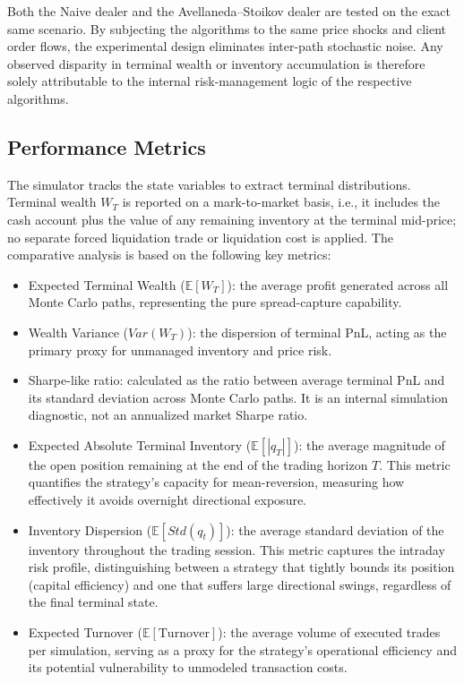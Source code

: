 Both the Naive dealer and the Avellaneda--Stoikov dealer are tested on the exact same scenario. By subjecting the algorithms to the same price shocks and client order flows, the experimental design eliminates inter-path stochastic noise. Any observed disparity in terminal wealth or inventory accumulation is therefore solely attributable to the internal risk-management logic of the respective algorithms.

\subsection{Performance Metrics}
The simulator tracks the state variables to extract terminal distributions. Terminal wealth $W_T$ is reported on a mark-to-market basis, i.e., it includes the cash account plus the value of any remaining inventory at the terminal mid-price; no separate forced liquidation trade or liquidation cost is applied. The comparative analysis is based on the following key metrics:

\begin{itemize}
    \item Expected Terminal Wealth ($\mathbb{E}[W_T]$): the average profit generated across all Monte Carlo paths, representing the pure spread-capture capability.
    \item Wealth Variance ($Var(W_T)$): the dispersion of terminal PnL, acting as the primary proxy for unmanaged inventory and price risk.
    \item Sharpe-like ratio: calculated as the ratio between average terminal PnL and its standard deviation across Monte Carlo paths. It is an internal simulation diagnostic, not an annualized market Sharpe ratio.
    \item Expected Absolute Terminal Inventory ($\mathbb{E}[|q_T|]$): the average magnitude of the open position remaining at the end of the trading horizon $T$. This metric quantifies the strategy's capacity for mean-reversion, measuring how effectively it avoids overnight directional exposure.
    \item Inventory Dispersion ($\mathbb{E}[Std(q_t)]$): the average standard deviation of the inventory throughout the trading session. This metric captures the intraday risk profile, distinguishing between a strategy that tightly bounds its position (capital efficiency) and one that suffers large directional swings, regardless of the final terminal state.
    \item Expected Turnover ($\mathbb{E}[\text{Turnover}]$): the average volume of executed trades per simulation, serving as a proxy for the strategy's operational efficiency and its potential vulnerability to unmodeled transaction costs.
\end{itemize}

